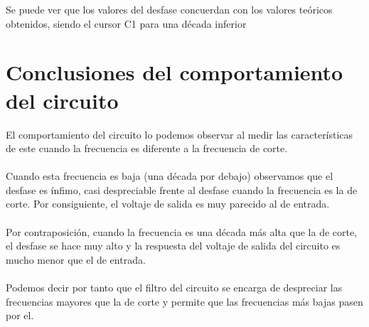\documentclass[11pt,letterpaper]{article}
\begin{document}
Se puede ver que los valores del desfase concuerdan con los valores teóricos obtenidos, siendo el cursor C1 para una década inferior

\section{Conclusiones del comportamiento del circuito}%
\label{sec:Conclusiones del comportamiento del circuito}
El comportamiento del circuito lo podemos observar al medir las características de este cuando la frecuencia es diferente a la frecuencia de corte. \\
\\
Cuando esta frecuencia es baja (una década por debajo) observamos que el desfase es ínfimo, casi despreciable frente al desfase cuando la frecuencia es la de corte. Por consiguiente, el voltaje de salida es muy parecido al de entrada.\\
\\
Por contraposición, cuando la frecuencia es una década más alta que la de corte, el desfase se hace muy alto y la respuesta del voltaje de salida del circuito es mucho menor que el de entrada.\\
\\
Podemos decir por tanto que el filtro del circuito se encarga de despreciar las frecuencias mayores que la de corte y permite que las frecuencias más bajas pasen por el. 
\end{document}
